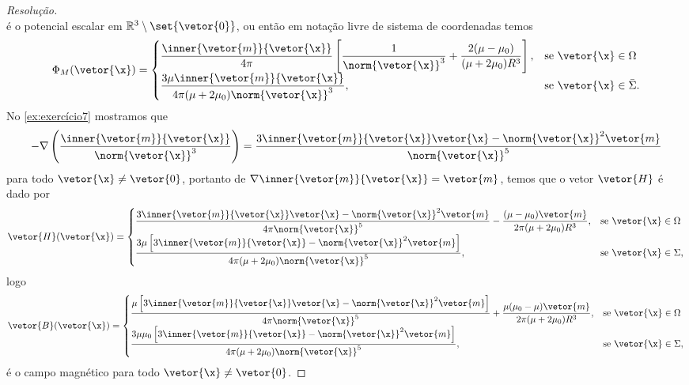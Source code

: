 \begin{proof}[Resolução]
\begin{equation*}
    \end{equation*}
    é o potencial escalar em \(\mathbb{R}^3 \setminus \set{\vetor{0}}\), ou então em notação livre de sistema de coordenadas temos
    \begin{equation*}
        \Phi_M(\vetor{\x}) =
        \begin{cases}
            \displaystyle\frac{\inner{\vetor{m}}{\vetor{\x}}}{4\pi}\left[\frac{1}{\norm{\vetor{\x}}^3} + \frac{2(\mu - \mu_0)}{(\mu + 2\mu_0)R^3}\right],&\text{se }\vetor{\x} \in \Omega\\
            \displaystyle\frac{3\mu \inner{\vetor{m}}{\vetor{\x}}}{4\pi (\mu + 2\mu_0) \norm{\vetor{\x}}^3},&\text{se }\vetor{\x}\in \bar{\Sigma}.
        \end{cases}
    \end{equation*}
    No \cref{ex:exercício7} mostramos que
    \begin{equation*}
        -\nabla \left(\frac{\inner{\vetor{m}}{\vetor{\x}}}{\norm{\vetor{\x}}^3}\right) = \frac{3\inner{\vetor{m}}{\vetor{\x}}\vetor{\x} - \norm{\vetor{\x}}^2\vetor{m}}{\norm{\vetor{\x}}^5}
    \end{equation*}
    para todo \(\vetor{\x} \neq \vetor{0}\), portanto de \(\nabla {\inner{\vetor{m}}{\vetor{\x}}} = \vetor{m}\), temos que o vetor \(\vetor{H}\) é dado por
    \begin{equation*}
        \vetor{H}(\vetor{\x}) = \begin{cases}
            \displaystyle\frac{3\inner{\vetor{m}}{\vetor{\x}}\vetor{\x} - \norm{\vetor{\x}}^2\vetor{m}}{4\pi \norm{\vetor{\x}}^5} - \frac{(\mu - \mu_0)\vetor{m}}{2\pi(\mu + 2\mu_0)R^3},&\text{se }\vetor{\x} \in \Omega\\
            \displaystyle\frac{3\mu \left[3\inner{\vetor{m}}{\vetor{\x}} - \norm{\vetor{\x}}^2\vetor{m}\right]}{4\pi (\mu + 2\mu_0)\norm{\vetor{\x}}^5},&\text{se }\vetor{\x} \in \Sigma,
        \end{cases}
    \end{equation*}
    logo
    \begin{equation*}
        \vetor{B}(\vetor{\x}) = \begin{cases}
            \displaystyle\frac{\mu\left[3\inner{\vetor{m}}{\vetor{\x}}\vetor{\x} - \norm{\vetor{\x}}^2\vetor{m}\right]}{4\pi \norm{\vetor{\x}}^5} + \frac{\mu(\mu_0 - \mu)\vetor{m}}{2\pi(\mu + 2\mu_0)R^3},&\text{se }\vetor{\x} \in \Omega\\
            \displaystyle\frac{3\mu\mu_0 \left[3\inner{\vetor{m}}{\vetor{\x}} - \norm{\vetor{\x}}^2\vetor{m}\right]}{4\pi (\mu + 2\mu_0)\norm{\vetor{\x}}^5},&\text{se }\vetor{\x} \in \Sigma,
        \end{cases}
    \end{equation*}
    é o campo magnético para todo \(\vetor{\x} \neq \vetor{0}\).
\end{proof}
